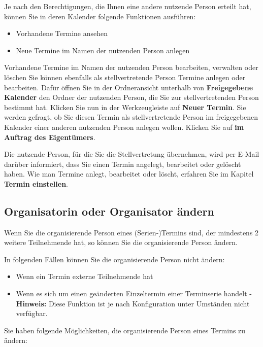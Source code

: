 \documentclass[
  letterpaper,
  DIV=11,
  numbers=noendperiod]{scrreprt}
\providecommand{\tightlist}{%
  \setlength{\itemsep}{0pt}\setlength{\parskip}{0pt}}\usepackage{longtable,booktabs,array}
\begin{document}
Je nach den Berechtigungen, die Ihnen eine andere nutzende Person
erteilt hat, können Sie in deren Kalender folgende Funktionen ausführen:

\begin{itemize}
\tightlist
\item
  Vorhandene Termine ansehen
\item
  Neue Termine im Namen der nutzenden Person anlegen
\end{itemize}

Vorhandene Termine im Namen der nutzenden Person bearbeiten, verwalten
oder löschen Sie können ebenfalls als stellvertretende Person Termine
anlegen oder bearbeiten. Dafür öffnen Sie in der Ordneransicht unterhalb
von \textbf{Freigegebene Kalender} den Ordner der nutzenden Person, die
Sie zur stellvertretenden Person bestimmt hat. Klicken Sie nun in der
Werkzeugleiste auf \textbf{Neuer Termin}. Sie werden gefragt, ob Sie
diesen Termin als stellvertretende Person im freigegebenen Kalender
einer anderen nutzenden Person anlegen wollen. Klicken Sie auf
\textbf{im Auftrag des Eigentümers}.

Die nutzende Person, für die Sie die Stellvertretung übernehmen, wird
per E-Mail darüber informiert, dass Sie einen Termin angelegt,
bearbeitet oder gelöscht haben. Wie man Termine anlegt, bearbeitet oder
löscht, erfahren Sie im Kapitel \textbf{Termin einstellen}.

\subsection{Organisatorin oder Organisator
ändern}\label{organisatorin-oder-organisator-uxe4ndern}

Wenn Sie die organisierende Person eines (Serien-)Termins sind, der
mindestens 2 weitere Teilnehmende hat, so können Sie die organisierende
Person ändern.

In folgenden Fällen können Sie die organisierende Person nicht ändern:

\begin{itemize}
\tightlist
\item
  Wenn ein Termin externe Teilnehmende hat
\item
  Wenn es sich um einen geänderten Einzeltermin einer Terminserie
  handelt - \textbf{Hinweis:} Diese Funktion ist je nach Konfiguration
  unter Umständen nicht verfügbar.
\end{itemize}

Sie haben folgende Möglichkeiten, die organisierende Person eines
Termins zu ändern:
\end{document}
